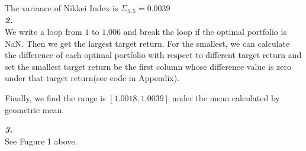 \documentclass[11pt,a4paper]{article}
\begin{document}
The variance of Nikkei Index is $\Sigma_{5,5}=0.0039$\\

\textit{\textbf{2.}}\\
We write a loop from $1$ to $1.006$ and break the loop if the optimal portfolio is NaN. Then we get the largest target return. For the smallest, we can calculate the difference of each optimal portfolio with respect to different target return and set the smallest target return be the first column whose difference value is zero under that target return(see code in Appendix).

Finally, we find the range is $[1.0018,1.0039]$ under the mean calculated by geometric mean.


\textit{\textbf{3.}}\\
See Fugure 1 above.
\end{document}
